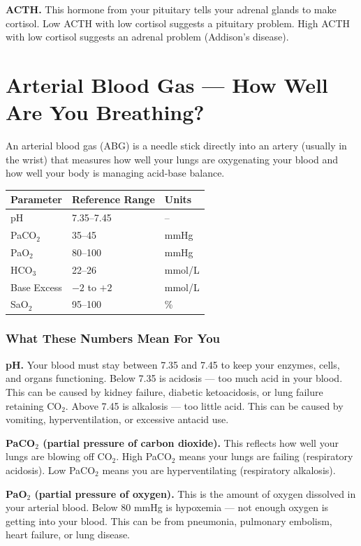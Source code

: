 \textbf{ACTH.} This hormone from your pituitary tells your adrenal glands to make cortisol. Low ACTH with low cortisol suggests a pituitary problem. High ACTH with low cortisol suggests an adrenal problem (Addison's disease).

\clearpage
\section{Arterial Blood Gas --- How Well Are You Breathing?}

An arterial blood gas (ABG) is a needle stick directly into an artery (usually in the wrist) that measures how well your lungs are oxygenating your blood and how well your body is managing acid-base balance.

\begin{longtable}{@{}lll@{}}
\toprule
\textbf{Parameter} & \textbf{Reference Range} & \textbf{Units} \\
\midrule
pH & 7.35--7.45 & -- \\
PaCO$_2$ & 35--45 & mmHg \\
PaO$_2$ & 80--100 & mmHg \\
HCO$_3$ & 22--26 & mmol/L \\
Base Excess & $-2$ to $+2$ & mmol/L \\
SaO$_2$ & 95--100 & \% \\
\bottomrule
\end{longtable}

\subsubsection{What These Numbers Mean For You}

\textbf{pH.} Your blood must stay between 7.35 and 7.45 to keep your enzymes, cells, and organs functioning. Below 7.35 is acidosis --- too much acid in your blood. This can be caused by kidney failure, diabetic ketoacidosis, or lung failure retaining CO$_2$. Above 7.45 is alkalosis --- too little acid. This can be caused by vomiting, hyperventilation, or excessive antacid use.

\textbf{PaCO$_2$ (partial pressure of carbon dioxide).} This reflects how well your lungs are blowing off CO$_2$. High PaCO$_2$ means your lungs are failing (respiratory acidosis). Low PaCO$_2$ means you are hyperventilating (respiratory alkalosis).

\textbf{PaO$_2$ (partial pressure of oxygen).} This is the amount of oxygen dissolved in your arterial blood. Below 80 mmHg is hypoxemia --- not enough oxygen is getting into your blood. This can be from pneumonia, pulmonary embolism, heart failure, or lung disease.

